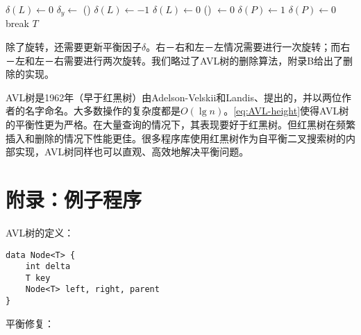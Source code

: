 \documentclass[b5paper]{ctexart}
\begin{document}
\begin{algorithmic}[1]
          \State $\delta(L) \gets 0$
          \State {}
        \Else {}
          \State $\delta_y \gets $ \textproc{$\delta$}()
            \State $\delta(L) \gets -1$
          \Else
            \State $\delta(L) \gets 0$
          \EndIf
          \State \textproc{$\delta$}() $\gets 0$
            \State $\delta(P) \gets 1$
          \Else
            \State $\delta(P) \gets 0$
          \EndIf
          \State {}
          \State {}
        \EndIf
      \EndIf
      \State break
    \EndIf
  \EndWhile
  \State \Return $T$
\EndFunction
\end{algorithmic}

除了旋转，还需要更新平衡因子$\delta$。右－右和左－左情况需要进行一次旋转；而右－左和左－右需要进行两次旋转。我们略过了AVL树的删除算法，附录B给出了删除的实现。

AVL树是1962年（早于红黑树）由Adelson-Velskii和Landis\cite{wiki-avl}、\cite{TFATP}提出的，并以两位作者的名字命名。大多数操作的复杂度都是$O(\lg n)$。\cref{eq:AVL-height}使得AVL树的平衡性更为严格。在大量查询的情况下，其表现要好于红黑树\cite{wiki-avl}。但红黑树在频繁插入和删除的情况下性能更佳。很多程序库使用红黑树作为自平衡二叉搜索树的内部实现，AVL树同样也可以直观、高效地解决平衡问题。

\section{附录：例子程序}

AVL树的定义：

\begin{lstlisting}[language = Bourbaki]
data Node<T> {
    int delta
    T key
    Node<T> left, right, parent
}
\end{lstlisting}

平衡修复：
\end{document}
